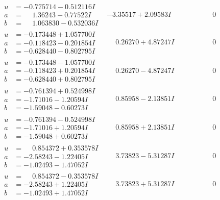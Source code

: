 \documentclass[1p]{elsarticle_modified}
\theoremstyle{definition}
\begin{document}
$$\begin{array}{c|c|c}
\begin{aligned}
u &= -0.775714 - 0.512116 I \\
a &= \phantom{-}1.36243 - 0.77522 I \\
b &= \phantom{-}1.063830 - 0.532036 I\end{aligned}
 & -3.35517 + 2.09583 I & \phantom{-0.000000 } 0 \\ \hline\begin{aligned}
u &= -0.173448 + 1.057700 I \\
a &= -0.118423 - 0.201854 I \\
b &= -0.628440 - 0.802795 I\end{aligned}
 & \phantom{-}0.26270 + 4.87247 I & \phantom{-0.000000 } 0 \\ \hline\begin{aligned}
u &= -0.173448 - 1.057700 I \\
a &= -0.118423 + 0.201854 I \\
b &= -0.628440 + 0.802795 I\end{aligned}
 & \phantom{-}0.26270 - 4.87247 I & \phantom{-0.000000 } 0 \\ \hline\begin{aligned}
u &= -0.761394 + 0.524998 I \\
a &= -1.71016 - 1.20594 I \\
b &= -1.59048 - 0.60273 I\end{aligned}
 & \phantom{-}0.85958 - 2.13851 I & \phantom{-0.000000 } 0 \\ \hline\begin{aligned}
u &= -0.761394 - 0.524998 I \\
a &= -1.71016 + 1.20594 I \\
b &= -1.59048 + 0.60273 I\end{aligned}
 & \phantom{-}0.85958 + 2.13851 I & \phantom{-0.000000 } 0 \\ \hline\begin{aligned}
u &= \phantom{-}0.854372 + 0.353578 I \\
a &= -2.58243 - 1.22405 I \\
b &= -1.02493 - 1.47052 I\end{aligned}
 & \phantom{-}3.73823 - 5.31287 I & \phantom{-0.000000 } 0 \\ \hline\begin{aligned}
u &= \phantom{-}0.854372 - 0.353578 I \\
a &= -2.58243 + 1.22405 I \\
b &= -1.02493 + 1.47052 I\end{aligned}
 & \phantom{-}3.73823 + 5.31287 I & \phantom{-0.000000 } 0 \\ \hline\begin{aligned}

\end{aligned}
\end{array}$$
\end{document}

